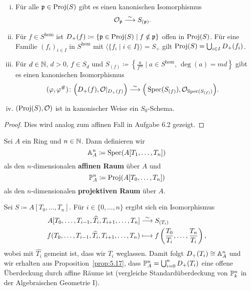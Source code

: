 \begin{prop}
\label{prop:5.17}
	\begin{enumerate}[i)]
		\item Für alle $\mfp \in \Proj(S)$ gibt es einen kanonischen Isomorphismus
		\[
			\mco_\mfp \simto S_{(\mfp)}.
		\]
		\item Für $f \in S^{\text{hom}}$ ist $D_+(f) \coloneqq \{\mfp \in \Proj(S) \mid f \notin \mfp\}$ offen in $\Proj(S)$. Für eine Familie $(f_i)_{i\in I}$ in $S^{\text{hom}}$ mit $\langle\{f_i\mid i\in I\}\rangle = S_+$ gilt $\Proj(S) = \bigcup_{i\in I} D_+(f_i)$.
		\item Für $d \in \N$, $d>0$, $f \in S_d$ und $S_{(f)} \coloneqq \left\lbrace \frac{a}{f^m}\mid a \in S^{\text{hom}},\, \deg(a) = md\right\rbrace$ gibt es einen kanonischen Isomorphismus
		\[
			(\varphi, \varphi^{\#})\colon\Big(D_+(f),\mco\vert_{D_+(f)}\Big)\simto \Big(\Spec(S_{(f)}),\mco_{\Spec(S_{(f)})}\Big).
		\]
		\item $(\Proj(S),\mco)$ ist in kanonischer Weise ein $S_0$-Schema.
	\end{enumerate}
	\begin{proof}
		Dies wird analog zum affinen Fall in Aufgabe 6.2 gezeigt.
	\end{proof}
\end{prop}

\begin{defn}
\label{defn:5.18}
	Sei $A$ ein Ring und $n \in \N$. Dann definieren wir
	\[
		\A^n_A \coloneqq \Spec(A[T_1,\ldots,T_n])
	\]
	als den $n$-dimensionalen \textbf{affinen Raum} über $A$ und
	\[
		\P^n_A \coloneqq \Proj(A[T_0,\ldots,T_n])
	\]
	als den $n$-dimensionalen \textbf{projektiven Raum} über $A$.
\end{defn}
\begin{bsp}
\label{bsp:5.19}
	Sei $S \coloneqq A[T_0,\ldots,T_n]$. Für $i \in \{0,\ldots,n\}$ ergibt sich ein Isomorphismus
	\begin{align*}
		A[T_0,\ldots,T_{i-1},\widehat{T_i},T_{i+1},\ldots,T_n] & \simto S_{(T_i)}\\
		f(T_0,\ldots,T_{i-1},\widehat{T_i},T_{i+1},\ldots,T_n) & \longmapsto f\left(\frac{T_0}{T_i},\ldots,\frac{T_n}{T_i}\right),
	\end{align*}
	wobei mit $\widehat{T_i}$ gemeint ist, dass wir $T_i$ weglassen. Damit folgt $D_+(T_i) \cong \A^n_A$ und wir erhalten aus Proposition~\ref{prop:5.17}, dass $\P^n_A = \bigcup_{i=0}^n D_+(T_i)$ eine offene Überdeckung durch affine Räume ist (vergleiche Standardüberdeckung von $\P^n_k$ in der Algebraischen Geometrie I).
\end{bsp}

